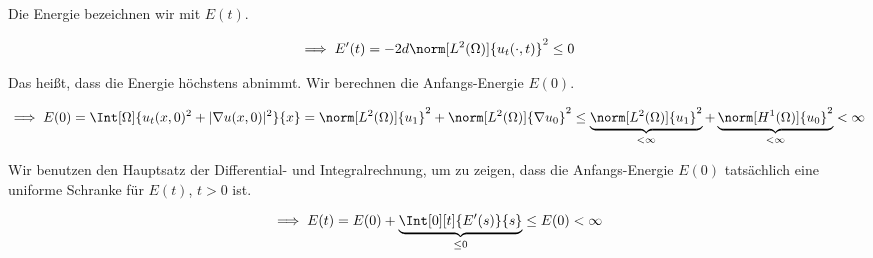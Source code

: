 \begin{solution}
\begin{enumerate}[label = (\roman*)]
    Die Energie bezeichnen wir mit $E(t)$.

    \begin{align*}
        \implies
        E^\prime(t)
        =
        -2 d \norm[L^2(\Omega)]{u_t(\cdot, t)}^2
        \leq
        0
    \end{align*}

    Das heißt, dass die Energie höchstens abnimmt.
    Wir berechnen die Anfangs-Energie $E(0)$.

    \begin{align*}
        \implies
        E(0)
        =
        \Int[\Omega]{u_t(x, 0)^2 + |\nabla u(x, 0)|^2}{x}
        =
        \norm[L^2(\Omega)]{u_1}^2 + \norm[L^2(\Omega)]{\nabla u_0}^2
        \leq
        \underbrace
        {
            \norm[L^2(\Omega)]{u_1}^2
        }_{
            < \infty
        }
        +
        \underbrace
        {
            \norm[H^1(\Omega)]{u_0}^2
        }_{
            < \infty
        }
        <
        \infty
    \end{align*}

    Wir benutzen den Hauptsatz der Differential- und Integralrechnung, um zu zeigen, dass die Anfangs-Energie $E(0)$ tatsächlich eine uniforme Schranke für $E(t)$, $t > 0$ ist.

    \begin{align*}
        \implies
        E(t)
        =
        E(0)
        +
        \underbrace
        {
            \Int[0][t]{E^\prime(s)}{s}
        }_{
            \leq 0
        }
        \leq
        E(0)
        <
        \infty
    \end{align*}


\end{enumerate}
\end{solution}
